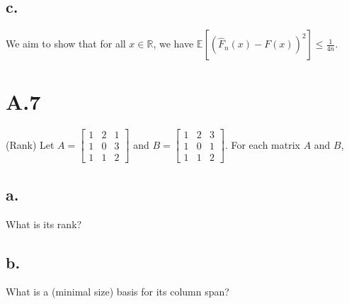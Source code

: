 \documentclass{article}
\newcommand{\field}[1]{\mathbb{#1}}
\newcommand{\1}{\mathbf{1}}
\newcommand{\E}{\mathbb{E}}
\newcommand{\R}{\field{R}} %
\begin{document}
{%

\subsection*{c.}
We aim to show that for all $x \in \R$, we have  $\displaystyle \E[ ( \widehat{F}_n(x) - F(x) )^2 ] \leq \tfrac{1}{4n}$. \\ 



}

\section*{A.7}
{\Large 

(Rank) Let $A = \begin{bmatrix} 1 & 2 & 1 \\ 1 & 0 & 3 \\ 1 & 1 & 2 \end{bmatrix}$ and $B = \begin{bmatrix} 1 & 2 & 3 \\ 1 & 0 & 1 \\ 1 & 1 & 2 \end{bmatrix}$.
For each matrix $A$ and $B$,

\subsection*{a.}
What is its rank? 

\subsection*{b.}
What is a (minimal size) basis for its column span?

}
\end{document}
